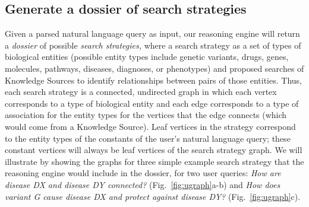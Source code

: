 \documentclass[11pt,notitlepage]{article}
\begin{document}
\subsection{Generate a dossier of search strategies}
\label{section:strategies}
Given a parsed natural language query as input, our reasoning engine will return
a {\em dossier\/} of possible {\em search strategies,\/} where a search strategy
as a set of types of biological entities (possible entity types include genetic
variants, drugs, genes, molecules, pathways, diseases, diagnoses, or phenotypes)
and proposed searches of Knowledge Sources to identify relationships between
pairs of those entities. Thus, each search strategy is a connected, undirected
graph in which each vertex corresponds to a type of biological entity and each
edge corresponds to a type of association for the entity types for the vertices
that the edge connects (which would come from a Knowledge Source).  Leaf
vertices in the strategy correspond to the entity types of the constants of the
user's natural language query; these constant vertices will always be leaf
vertices of the search strategy graph. We will illustrate by showing the graphs
for three simple example search strategy that the reasoning engine would include
in the dossier, for two user queries: {\em How are disease DX and disease DY
  connected?\/} (Fig.~\ref{fig:ugraph}a-b) and {\em How does variant G cause
  disease DX and protect against disease DY?\/} (Fig.~\ref{fig:ugraph}c).
\end{document}
